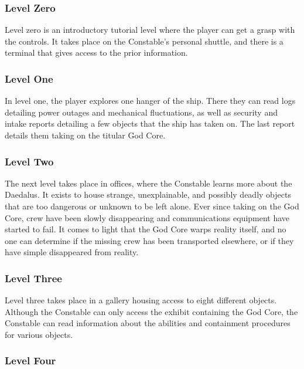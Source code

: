 \documentclass{article}
\begin{document}
\subsubsection{Level Zero} \label{subsubsec:levelzero}

Level zero is an introductory tutorial level where the player can get a grasp with the controls. It takes place on the Constable's personal shuttle, and there is a terminal that gives access to the prior information.

\subsubsection{Level One} \label{subsubsec:levelone}

In level one, the player explores one hanger of the ship. There they can read logs detailing power outages and mechanical fluctuations, as well as security and intake reports detailing a few objects that the ship has taken on. The last report details them taking on the titular God Core.

\subsubsection{Level Two} \label{subsubsec:leveltwo}

The next level takes place in offices, where the Constable learns more about the Daedalus. It exists to house strange, unexplainable, and possibly deadly objects that are too dangerous or unknown to be left alone. Ever since taking on the God Core, crew have been slowly disappearing and communications equipment have started to fail. It comes to light that the God Core warps reality itself, and no one can determine if the missing crew has been transported elsewhere, or if they have simple disappeared from reality.

\subsubsection{Level Three} \label{subsubsec:levelthree}

Level three takes place in a gallery housing access to eight different objects. Although the Constable can only access the exhibit containing the God Core, the Constable can read information about the abilities and containment procedures for various objects.

\subsubsection{Level Four} \label{subsubsec:four}
\end{document}
